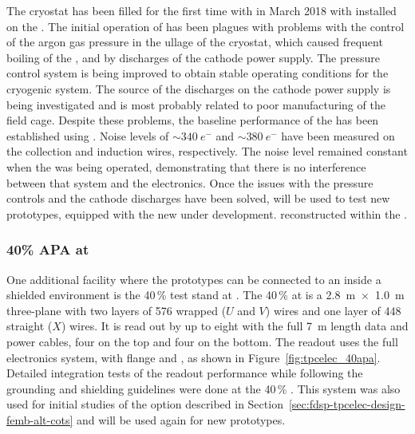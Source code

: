 The  cryostat has been filled for the first time with 
in March 2018 with   installed on the . The
initial operation of  has been plagues with problems with the
control of the argon gas pressure in the ullage of the cryostat, which caused
frequent boiling of the , and by discharges of the cathode power supply. 
The pressure control system is being improved to obtain stable operating conditions
for the cryogenic system. The source of the discharges on the cathode power supply
is being investigated and is most probably related to poor manufacturing of the
field cage. Despite these problems, the baseline performance of the  
 has been established using  . Noise levels of 
$\sim\SI{340}{e^-}$ and $\sim\SI{380}{e^-}$ have been measured on the collection 
and induction wires, respectively. The noise level remained constant when the
 was being operated, demonstrating that there is no interference 
between that system and the  electronics.
Once the issues with the pressure controls and the cathode discharges have been
solved,  will be used to test new  prototypes, equipped
with the new  under development. 
reconstructed within the . 

\subsubsection{40\% APA at }
\label{sec:fdsp-tpcelec-qa-facilities-fortypercent}

One additional facility where the  prototypes can be connected to
an  inside a shielded environment is the \num{40}\,\%  
test stand at . The \num{40}\,\%  at  is a \SI{2.8}{m}~$\times$~\SI{1.0}{m} 
three-plane  with two layers of \num{576} wrapped ($U$ and $V$) wires 
and one layer of \num{448} straight ($X$) wires. It is read out by up to eight 
 with the full \SI{7}{m}  length data and  power 
cables, four on the top and four on the bottom. The readout uses the full  electronics 
system, with  flange and , as shown in Figure~\ref{fig:tpcelec_40apa}. 
Detailed integration tests of the   readout performance while 
following the  grounding and shielding guidelines were done at the \num{40}\,\% 
. This system was also used for initial studies of the  
option described in Section~\ref{sec:fdsp-tpcelec-design-femb-alt-cots} and will
be used again for new  prototypes.

